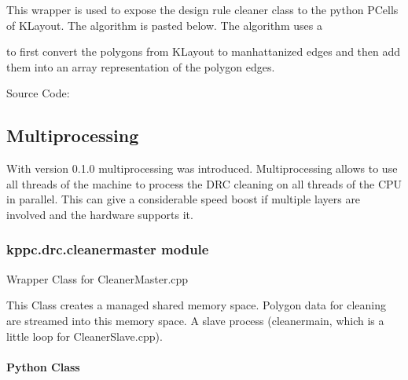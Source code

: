 \documentclass[a4paper,10pt,english]{sphinxmanual}
\begin{document}
This wrapper is used to expose the design rule cleaner class to the python PCells of KLayout.
The algorithm is pasted below. The algorithm uses a %
\begin{footnote}[12]\sphinxAtStartFootnote
{}
%
\end{footnote}
to first convert the polygons from KLayout to manhattanized edges and then add them into an array representation
of the polygon edges.

Source Code: {\hyperref[\detokenize{source_code/drcsl_source:drcslsource}]{}}


\subsection{Multiprocessing}
\label{\detokenize{drc/drc:multiprocessing}}
With version 0.1.0 multiprocessing was introduced. Multiprocessing allows to use all threads of the machine to process the DRC cleaning on all threads of the CPU in parallel. This can give a considerable speed boost if multiple layers are involved and the hardware supports it.


\subsubsection{kppc.drc.cleanermaster module}
\label{\detokenize{drc/drc:kppc-drc-cleanermaster-module}}\label{\detokenize{drc/drc:cm}}
Wrapper Class for CleanerMaster.cpp

This Class creates a managed shared memory space. Polygon data for cleaning are streamed into this memory space. A slave process (cleanermain, which is a little loop for CleanerSlave.cpp).


\paragraph{Python Class}
\label{\detokenize{drc/drc:python-class}}
\end{document}
